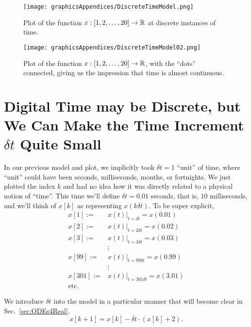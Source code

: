 \begin{figure}
\centering
\begin{minipage}{.4\textwidth}
  \centering
\texttt{[image: graphicsAppendices/DiscreteTimeModel.png]}
  \caption{Plot of the function $x:[1, 2, \ldots, 20]\to \mathbb R$ at discrete instances of time.}
  \label{fig:Proj03Plot01}
\end{minipage}%
\hspace*{1cm}
\begin{minipage}{.4\textwidth}
  \centering
 \texttt{[image: graphicsAppendices/DiscreteTimeModel02.png]}
  \caption{Plot of the function $x:[1, 2, \ldots, 20]\to \mathbb R$, with the ``dots'' connected, giving us the impression that time is almost continuous.}
  \label{fig:Proj03Plot02}
\end{minipage}
\label{fig:Proj03Plot0102}
\end{figure}

\section{Digital Time may be Discrete, but We Can Make the Time Increment $\delta t$ Quite Small}
\label{sec:DiscreteTime02}
In our previous model and plot, we implicitly took $\delta t = 1$ ``unit'' of time, where ``unit'' could have been seconds, milliseconds, months, or fortnights. We just plotted the index $k$ and had no idea how it was directly related to a physical notion of ``time''. 
This time we'll define $\delta t = 0.01$ seconds, that is, $10$ milliseconds, and we'll think of $x[k]$ as representing $x(k \delta t)$. To be super explicit,
\begin{align*}
    x[1]:=&\left. x(t) \right|_{t=\delta t}=x(0.01)\\
    x[2]:=&\left. x(t) \right|_{t=2\delta t}=x(0.02)\\
    x[3]:= &\left. x(t) \right|_{t=3\delta t}=x(0.03)\\
    &  \vdots\\
    x[99]:=&\left. x(t) \right|_{t=99\delta t}=x(0.99)\\
    & \vdots \\
    x[301] :=& \left. x(t) \right|_{t=301\delta t}=x(3.01)\\
    \text{etc.} &
\end{align*}

We introduce $\delta t$ into the model in a particular manner that will become clear in Sec.~\ref{sec:ODEs4Real},
\begin{equation}
    \label{eq:DiscreteEquation02}
    x[k+1]= x[k] - \delta t \cdot (x[k] + 2).
\end{equation}

